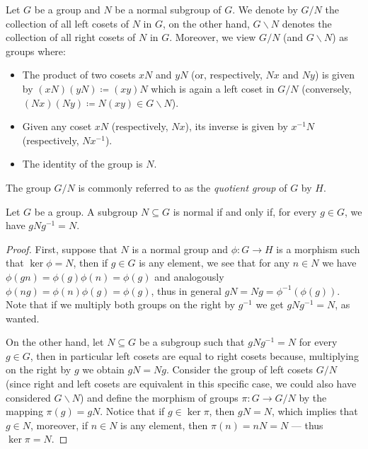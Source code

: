 \begin{definition}
    \label{def:quotient-group}
    Let \(G\) be a group and \(N\) be a normal subgroup of \(G\). We denote by
    \(G/N\) the collection of all left cosets of \(N\) in \(G\), on the other hand,
    \(G \backslash N\) denotes the collection of all right cosets of \(N\) in
    \(G\). Moreover, we view \(G/N\) (and \(G \backslash N\)) as groups where:
    \begin{itemize}\setlength\itemsep{0em}
        \item The product of two cosets \(x N\) and \(y N\) (or, respectively, \(N
              x\) and \(N y\)) is given by \((x N) (y N) \coloneq (x y) N\) which is again a
              left coset in \(G/N\) (conversely, \((N x) (N y) \coloneq N (x y) \in G
              \backslash N\)).
        \item Given any coset \(x N\) (respectively, \(N x\)), its inverse is given by
              \(x^{-1} N\) (respectively, \(N x^{-1}\)).
        \item The identity of the group is \(N\).
    \end{itemize}
    The group \(G/N\) is commonly referred to as the \emph{quotient group} of \(G\)
    by \(H\).
\end{definition}

\begin{proposition}
    \label{prop:normal-subgroup-equivalence}
    Let \(G\) be a group. A subgroup \(N \subseteq G\) is normal if and only if, for
    every \(g \in G\), we have \(gNg^{-1} = N\).
\end{proposition}

\begin{proof}
    First, suppose that \(N\) is a normal group and \(\phi: G \to H\) is a morphism
    such that \(\ker \phi = N\), then if \(g \in G\) is any element, we see that for
    any \(n \in N\) we have \(\phi(g n) = \phi(g) \phi(n) = \phi(g)\) and
    analogously \(\phi(n g) = \phi(n) \phi(g) = \phi(g)\), thus in general \(g N = N
    g = \phi^{-1}(\phi(g))\). Note that if we multiply both groups on the right by
    \(g^{-1}\) we get \(g N g^{-1} = N\), as wanted.

    On the other hand, let \(N \subseteq G\) be a subgroup such that \(g N g^{-1} =
    N\) for every \(g \in G\), then in particular left cosets are equal to right
    cosets because, multiplying on the right by \(g\) we obtain \(g N = N
    g\). Consider the group of left cosets \(G/N\) (since right and left cosets are
    equivalent in this specific case, we could also have considered \(G \backslash
    N\)) and define the morphism of groups \(\pi: G \to G/N\) by the mapping
    \(\pi(g) = g N\). Notice that if \(g \in \ker \pi\), then \(g N = N\), which
    implies that \(g \in N\), moreover, if \(n \in N\) is any element, then
    \(\pi(n) = n N = N\) --- thus \(\ker \pi = N\).
\end{proof}


